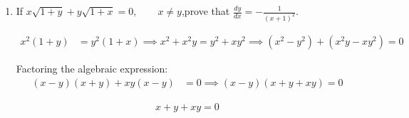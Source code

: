 \begin{enumerate}[label=\thesubsection.\arabic*, ref=\thesubsection.\theenumi]
Injectivity (One-One):
Let $x_1, x_2 \in \mathbb{N}$ such that:
\begin{align*}
	f(x_1) &= f(x_2) \\
	4x_1 + 3 = 4x_2 + 3 \implies
	4x_1 = 4x_2 \implies
	x_1 = x_2
\end{align*}
Since $f(x_1) = f(x_2) \implies x_1 = x_2$ for all $x_1, x_2 \in \mathbb{N}$, the function $f$ is injective (one-one).

Surjectivity (Onto):
Let $y \in Y$ be an arbitrary element. By the definition of set $Y$[cite: 1]:
\begin{align*}
	y = 4x + 3 \quad \text{for some } x \in \mathbb{N}
\end{align*}
Solving for $x$ in terms of $y$:
\begin{align*}
	4x &= y - 3 \implies
	x = \frac{y - 3}{4}
\end{align*}
Since $y \in Y$, by construction $\dfrac{y - 3}{4}$ is guaranteed to be a natural number $x \in \mathbb{N}$ such that:
\begin{align*}
	f(x) = f\left(\frac{y - 3}{4}\right) = 4\left(\frac{y - 3}{4}\right) + 3 = (y - 3) + 3 = y
\end{align*}
Thus, every element in codomain $Y$ has a pre-image in domain $\mathbb{N}$. Therefore, $f$ is surjective (onto).

Finding the Inverse Function $f^{-1}$:
Define a function $g: Y \to \mathbb{N}$ by:
\begin{align*}
	g(y) = \frac{y - 3}{4}
\end{align*}

\begin{align*}
	f^{-1}(y) = \frac{y - 3}{4}
\end{align*}

\item If $x\sqrt{1+y}+y\sqrt{1+x}=0,\qquad x\ne y$,prove that $\frac{dy}{dx}=-\frac{1}{(x+1)^2}$.

\solution
\begin{align*}
	x^2(1+y) &= y^2(1+x) \implies
	x^2 + x^2y = y^2 + xy^2 \implies
	(x^2 - y^2) + (x^2y - xy^2) = 0
\end{align*}

Factoring the algebraic expression:
\begin{align*}
	(x - y)(x + y) + xy(x - y) &= 0 \implies
	(x - y)\left(x + y + xy\right) = 0
\end{align*}

\begin{align*}
	x + y + xy = 0
\end{align*}


\end{enumerate}
